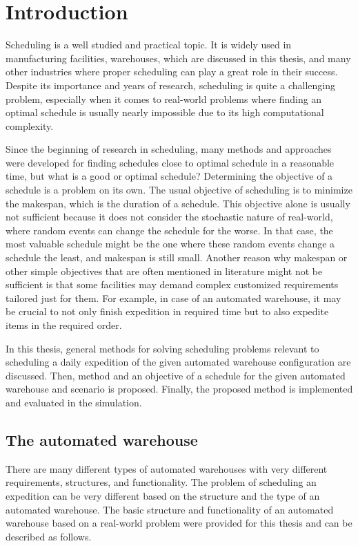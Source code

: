 \documentclass{ctuthesis}
\begin{document}
\maketitle

\chapter{Introduction}

Scheduling is a well studied and practical topic. It is widely used in manufacturing facilities, warehouses, which are discussed in this thesis, and many other industries where proper scheduling can play a great role in their success. Despite its importance and years of research, scheduling is quite a challenging problem, especially when it comes to real-world problems where finding an optimal schedule is usually nearly impossible due to its high computational complexity. 

Since the beginning of research in scheduling, many methods and approaches were developed for finding schedules close to optimal schedule in a reasonable time, but what is a good or optimal schedule? Determining the objective of a schedule is a problem on its own. The usual objective of scheduling is to minimize the makespan, which is the duration of a schedule. This objective alone is usually not sufficient because it does not consider the stochastic nature of real-world, where random events can change the schedule for the worse. In that case, the most valuable schedule might be the one where these random events change a schedule the least, and makespan is still small. Another reason why makespan or other simple objectives that are often mentioned in literature might not be sufficient is that some facilities may demand complex customized requirements tailored just for them. For example, in case of an automated warehouse, it may be crucial to not only finish expedition in required time but to also expedite items in the required order. 

In this thesis, general methods for solving scheduling problems relevant to scheduling a daily expedition of the given automated warehouse configuration are discussed. Then, method and an objective of a schedule for the given automated warehouse and scenario is proposed. Finally, the proposed method is implemented and evaluated in the simulation.

\section{The automated warehouse}
\label{sec:wh}
There are many different types of automated warehouses with very different requirements, structures, and functionality. The problem of scheduling an expedition can be very different based on the structure and the type of an automated warehouse. The basic structure and functionality of an automated warehouse based on a real-world problem were provided for this thesis and can be described as follows.
\end{document}
